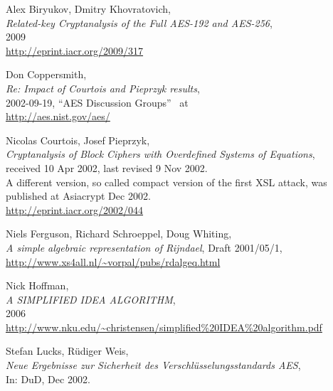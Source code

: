 \newpage
\begin{thebibliography}{99999}

 
	Alex Biryukov, Dmitry Khovratovich, \\
	{\em Related-key Cryptanalysis of the Full AES-192 and AES-256}, \\
	2009 \\
	\url{http://eprint.iacr.org/2009/317}

  
        Don Coppersmith, \\
        {\em Re: Impact of Courtois and Pieprzyk results}, \\
        2002-09-19, ``AES Discussion Groups''~ at \\
        \url{http://aes.nist.gov/aes/}

  
        Nicolas Courtois, Josef Pieprzyk, \\
        {\em Cryptanalysis of Block Ciphers with Overdefined Systems
             of Equations}, \\
        received 10 Apr 2002, last revised 9 Nov 2002.\\
        A different version, so called compact version of the first XSL attack,
        was published at Asiacrypt Dec 2002. \\
        \url{http://eprint.iacr.org/2002/044}

  
       Niels Ferguson, Richard Schroeppel, Doug Whiting, \\
       {\em A simple algebraic representation of Rijndael}, 
       Draft 2001/05/1, \\
       \url{http://www.xs4all.nl/~vorpal/pubs/rdalgeq.html}

  
       Nick Hoffman, \\
       {\em A SIMPLIFIED IDEA ALGORITHM},\\
       2006 \\
       \url{http://www.nku.edu/~christensen/simplified%20IDEA%20algorithm.pdf}

  
       Stefan Lucks, R\"udiger Weis, \\
       {\em Neue Ergebnisse zur Sicherheit des Verschl\"usselungsstandards AES},\\
       In: DuD, Dec 2002.


\end{thebibliography}
